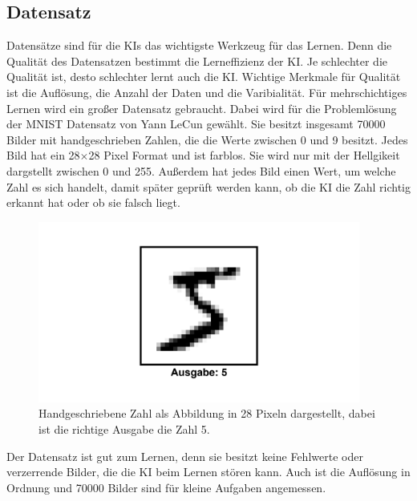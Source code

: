 \documentclass[11pt]{article}
\begin{document}
\subsection{Datensatz}
Datensätze sind für die KIs das wichtigste Werkzeug für das Lernen. Denn die Qualität des Datensatzen bestimmt die Lerneffizienz der KI.
Je schlechter die Qualität ist, desto schlechter lernt auch die KI. Wichtige Merkmale für Qualität ist die Auflösung, die Anzahl der Daten und die Varibialität.
Für mehrschichtiges Lernen wird ein großer Datensatz gebraucht. Dabei wird für die Problemlösung der MNIST Datensatz von Yann LeCun gewählt.
Sie besitzt insgesamt 70000 Bilder mit handgeschrieben Zahlen, die die Werte zwischen 0 und 9 besitzt. Jedes Bild hat ein 28$\times$28 Pixel
Format und ist farblos. Sie wird nur mit der Hellgikeit dargstellt zwischen 0 und 255. Außerdem hat jedes Bild einen Wert, um welche Zahl
es sich handelt, damit später geprüft werden kann, ob die KI die Zahl richtig erkannt hat oder ob sie falsch liegt.
\begin{figure}[h]
    \centering
    \includegraphics[width=300pt, keepaspectratio]{images/number}
    \caption{Handgeschriebene Zahl als Abbildung in 28 Pixeln dargestellt, dabei ist die richtige Ausgabe die Zahl 5.}
\end{figure}
Der Datensatz ist gut zum Lernen, denn sie besitzt keine Fehlwerte oder verzerrende Bilder, die die KI beim Lernen stören kann. Auch ist die
Auflösung in Ordnung und 70000 Bilder sind für kleine Aufgaben angemessen.
\end{document}
